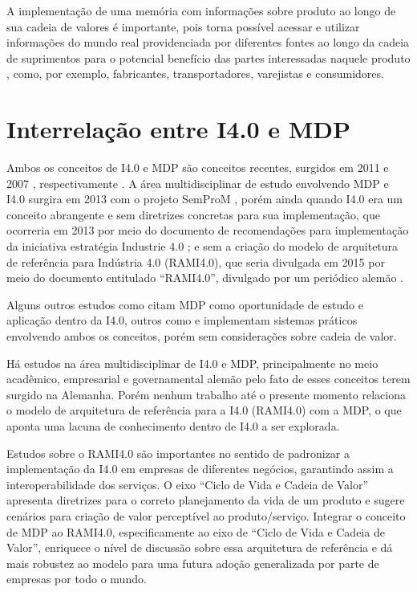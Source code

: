 \documentclass[
	12pt,				%
	oneside,			%
	a4paper,			%
	english,			%
	brazil				%
]{abntex2}
\begin{document}
	A implementação de uma memória com informações sobre produto ao longo de sua cadeia de valores é importante, pois torna possível acessar e utilizar informações do mundo real providenciada por diferentes fontes ao longo da cadeia de suprimentos para o potencial benefício das partes interessadas naquele produto \cite{brandherm2011productmemory}, como, por exemplo, fabricantes, transportadores, varejistas e consumidores. 
	
\section{Interrelação entre I4.0 e MDP}

 	Ambos os conceitos de I4.0 e MDP são conceitos recentes, surgidos em 2011 \cite{kagermann2011industrie} e 2007 \cite{wahlster2007digitalmemory}, respectivamente . A área multidisciplinar de estudo envolvendo MDP e I4.0 surgira em 2013 com o projeto SemProM \cite{wahlster2013semprom}, porém ainda quando I4.0 era um conceito abrangente e sem diretrizes concretas para sua implementação, que ocorreria em 2013 por meio do documento de recomendações para implementação da iniciativa estratégia Industrie 4.0 \cite{kagermann2013recommendations}; e sem a criação do modelo de arquitetura de referência para Indústria 4.0 (RAMI4.0), que seria divulgada em 2015 por meio do documento entitulado ``RAMI4.0'', divulgado por um periódico alemão \cite{hankel2015rami}.
 	
 	 Alguns outros estudos como  citam MDP como oportunidade de estudo e aplicação dentro da I4.0, outros como  e  implementam sistemas práticos envolvendo ambos os conceitos, porém sem considerações sobre cadeia de valor.
 	
	Há estudos na área multidisciplinar de I4.0 e MDP, principalmente no meio acadêmico, empresarial e governamental alemão pelo fato de esses conceitos terem surgido na Alemanha. Porém nenhum trabalho até o presente momento relaciona o modelo de arquitetura de referência para a I4.0 (RAMI4.0) com a MDP, o que aponta uma lacuna de conhecimento dentro de I4.0 a ser explorada.
	
	Estudos sobre o RAMI4.0 são importantes no sentido de padronizar a implementação da I4.0 em empresas de diferentes negócios, garantindo assim a interoperabilidade dos serviços. O eixo ``Ciclo de Vida e Cadeia de Valor'' apresenta diretrizes para o correto planejamento da vida de um produto e sugere cenários para criação de valor perceptível ao produto/serviço. Integrar o conceito de MDP ao RAMI4.0, especificamente ao eixo de ``Ciclo de Vida e Cadeia de Valor'', enriquece o nível de discussão sobre essa arquitetura de referência e dá mais robustez ao modelo para uma futura adoção generalizada por parte de empresas por todo o mundo.
	
\end{document}

